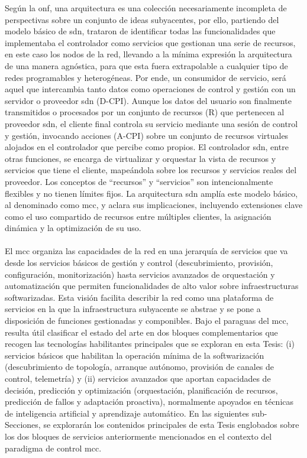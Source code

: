 Según la \gls{onf}, una arquitectura es una colección necesariamente incompleta de perspectivas sobre un conjunto de ideas subyacentes, por ello, partiendo del modelo básico de \gls{sdn}, trataron de identificar todas las funcionalidades que implementaba el controlador como servicios que gestionan una serie de recursos, en este caso los nodos de la red, llevando a la mínima expresión la arquitectura de una manera agnóstica, para que esta fuera extrapolable a cualquier tipo de redes programables y heterogéneas. Por ende, un consumidor de servicio, será aquel que intercambia tanto datos como operaciones de control y gestión con un servidor o proveedor \gls{sdn} (D-CPI).  Aunque los datos del usuario son finalmente transmitidos o procesados por un conjunto de recursos (R) que pertenecen al proveedor \gls{sdn}, el cliente final controla su servicio mediante una sesión de control y gestión, invocando acciones (A-CPI) sobre un conjunto de recursos virtuales alojados en el controlador que percibe como propios. El controlador \gls{sdn}, entre otras funciones, se encarga de virtualizar y orquestar la vista de recursos y servicios que tiene el cliente, mapeándola sobre los recursos y servicios reales del proveedor. Los conceptos de ``recursos'' y ``servicios'' son intencionalmente flexibles y no tienen límites fijos. La arquitectura \gls{sdn} amplía este modelo básico, al denominado como \gls{mcc}, y aclara sus implicaciones, incluyendo extensiones clave como el uso compartido de recursos entre múltiples clientes, la asignación dinámica y la optimización de su uso.\\
\\
El \gls{mcc} organiza las capacidades de la red en una jerarquía de servicios que va desde los servicios básicos de gestión y control (descubrimiento, provisión, configuración, monitorización) hasta servicios avanzados de orquestación y automatización que permiten funcionalidades de alto valor sobre infraestructuras softwarizadas. Esta visión facilita describir la red como una plataforma de servicios en la que la infraestructura subyacente se abstrae y se pone a disposición de funciones gestionadas y componibles. Bajo el paraguas del \gls{mcc}, resulta útil clasificar el estado del arte en dos bloques complementarios que recogen las tecnologías habilitantes principales que se exploran en esta Tesis: (i) servicios básicos que habilitan la operación mínima de la softwarización (descubrimiento de topología, arranque autónomo, provisión de canales de control, telemetría) y (ii) servicios avanzados que aportan capacidades de decisión, predicción y optimización (orquestación, planificación de recursos, predicción de fallos y adaptación proactiva), normalmente apoyados en técnicas de inteligencia artificial y aprendizaje automático. En las siguientes sub-Secciones, se explorarán los contenidos principales de esta Tesis englobados sobre los dos bloques de servicios anteriormente mencionados en el contexto del paradigma de control \gls{mcc}.


